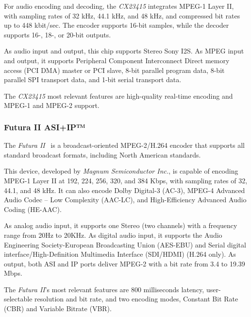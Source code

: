 
For audio encoding and decoding, the \textit{CX23415} integrates MPEG-1 Layer II, with sampling rates of 32 kHz, 44.1 kHz, and 48 kHz, and compressed bit rates up to 448 kbit/sec. The encoder supports 16-bit samples, while the decoder supports 16-, 18-, or 20-bit outputs.

As audio input and output, this chip supports Stereo Sony I2S. As MPEG input and output, it supports Peripheral Component Interconnect Direct memory access (PCI DMA) master or PCI slave, 8-bit parallel program data, 8-bit parallel SPI transport data, and 1-bit serial transport data.

The \textit{CX23415} most relevant features are high-quality real-time encoding and MPEG-1 and MPEG-2 support.

\subsubsection{Futura II ASI+IP™}

The \textit{Futura II}~\cite{futura} is a broadcast-oriented MPEG-2/H.264 encoder that supports all standard broadcast formats, including North American standards. 

This device, developed by \textit{Magnum Semiconductor Inc.}, is capable of encoding MPEG-1 Layer II at 192, 224, 256, 320, and 384 Kbps, with sampling rates of 32, 44.1, and 48 kHz. It can also encode Dolby Digital-3 (AC-3), MPEG-4 Advanced Audio Codec – Low Complexity (AAC-LC), and High-Efficiency Advanced Audio Coding (HE-AAC).

As analog audio input, it supports one Stereo (two channels) with a frequency range from 20Hz to 20KHz. As digital audio input, it supports the Audio Engineering Society-European Broadcasting Union (AES-EBU) and Serial digital interface/High-Definition Multimedia Interface (SDI/HDMI) (H.264 only).
As output, both ASI and IP ports deliver MPEG-2 with a bit rate from 3.4 to 19.39 Mbps.

The \textit{Futura II}'s most relevant features are 800 milliseconds latency, user-selectable resolution and bit rate, and two encoding modes, Constant Bit Rate (CBR) and Variable Bitrate (VBR).

